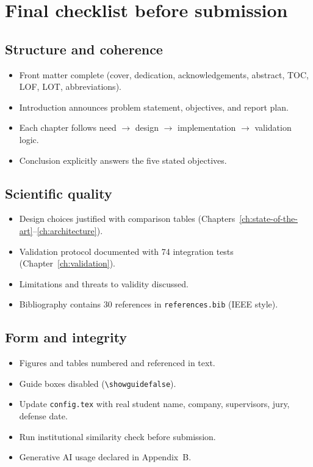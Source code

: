 \chapter{Final checklist before submission}

\section{Structure and coherence}

\begin{itemize}[leftmargin=*,itemsep=0.2em]
  \item \okitem{} Front matter complete (cover, dedication, acknowledgements, abstract, TOC, LOF, LOT, abbreviations).
  \item \okitem{} Introduction announces problem statement, objectives, and report plan.
  \item \okitem{} Each chapter follows need $\rightarrow$ design $\rightarrow$ implementation $\rightarrow$ validation logic.
  \item \okitem{} Conclusion explicitly answers the five stated objectives.
\end{itemize}

\section{Scientific quality}

\begin{itemize}[leftmargin=*,itemsep=0.2em]
  \item \okitem{} Design choices justified with comparison tables (Chapters~\ref{ch:state-of-the-art}--\ref{ch:architecture}).
  \item \okitem{} Validation protocol documented with 74 integration tests (Chapter~\ref{ch:validation}).
  \item \okitem{} Limitations and threats to validity discussed.
  \item \okitem{} Bibliography contains 30 references in \texttt{references.bib} (IEEE style).
\end{itemize}

\section{Form and integrity}

\begin{itemize}[leftmargin=*,itemsep=0.2em]
  \item \okitem{} Figures and tables numbered and referenced in text.
  \item \okitem{} Guide boxes disabled (\texttt{\textbackslash showguidefalse}).
  \item \warnitem{} Update \texttt{config.tex} with real student name, company, supervisors, jury, defense date.
  \item \warnitem{} Run institutional similarity check before submission.
  \item \okitem{} Generative AI usage declared in Appendix~B.
\end{itemize}

